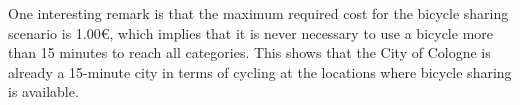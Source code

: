 One interesting remark is that the maximum required cost for the bicycle sharing scenario is 1.00€, which implies that it is never necessary to use a bicycle more than 15 minutes to reach all categories.
This shows that the City of Cologne is already a 15-minute city in terms of cycling at the locations where bicycle sharing is available.

